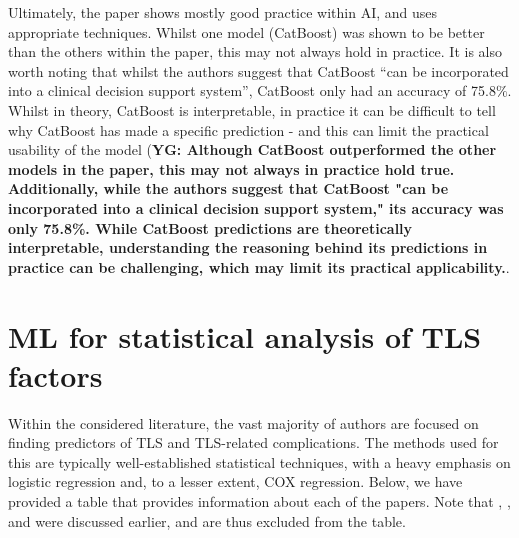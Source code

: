 \documentclass{article}
\begin{document}
Ultimately, the paper shows mostly good practice within AI, and uses appropriate techniques. Whilst one model (CatBoost) was shown to be better than the others within the paper, this may not always hold in practice. It is also worth noting that whilst the authors suggest that CatBoost “can be incorporated into a clinical decision support system”, CatBoost only had an accuracy of 75.8\(\%\). Whilst in theory, CatBoost is interpretable, in practice it can be difficult to tell why CatBoost has made a specific prediction - and this can limit the practical usability of the model (\textbf{YG:
Although CatBoost outperformed the other models in the paper, this may not always in practice hold true. Additionally, while the authors suggest that CatBoost "can be incorporated into a clinical decision support system," its accuracy was only 75.8\%. While CatBoost predictions are theoretically interpretable, understanding the reasoning behind its predictions in practice can be challenging, which may limit its practical applicability.}.

\section{ML for statistical analysis of TLS factors}


Within the considered literature, the vast majority of authors are focused on finding predictors of TLS and TLS-related complications. The methods used for this are typically well-established statistical techniques, with a heavy emphasis on logistic regression and, to a lesser extent, COX regression. Below, we have provided a table that provides information about each of the papers. Note that \cite{mato2004predictive}, 
\cite{montesinos2008tumor}, and  \cite{xiao2024prediction} were discussed earlier, and are thus excluded from the table.
\end{document}
